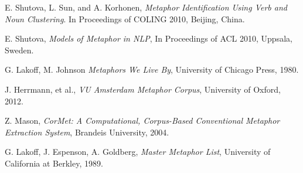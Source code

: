 \documentclass[12pt]{article}
\begin{document}
\begin{thebibliography}{9}

  E. Shutova, L. Sun, and A. Korhonen,
  \emph{Metaphor Identification Using Verb and Noun Clustering}.
  In Proceedings of COLING 2010,
  Beijing, China.
  
  E. Shutova,
  \emph{Models of Metaphor in NLP},
  In Proceedings of ACL 2010,
  Uppsala, Sweden.
  
  G. Lakoff, M. Johnson
  \emph{Metaphors We Live By},
  University of Chicago Press, 1980.

  J. Herrmann, et al.,
  \emph{VU Amsterdam Metaphor Corpus},
  University of Oxford, 2012.

  Z. Mason,
  \emph{CorMet: A Computational, Corpus-Based Conventional Metaphor Extraction System},
  Brandeis University, 2004.

  G. Lakoff, J. Espenson, A. Goldberg,
  \emph{Master Metaphor List},
  University of California at Berkley, 1989.

\end{thebibliography}
\end{document}
